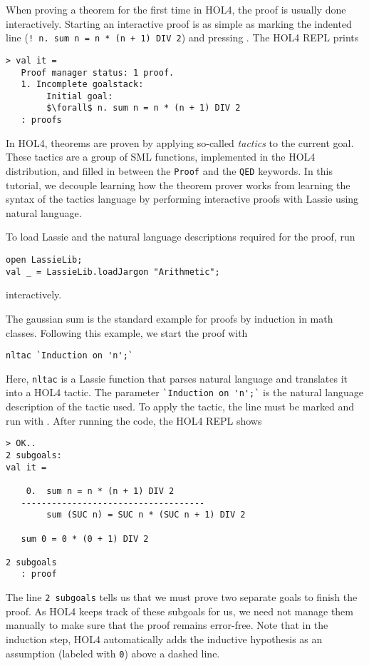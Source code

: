 When proving a theorem for the first time in HOL4, the proof is usually done
interactively.
Starting an interactive proof is as simple as marking the indented line
(\lstinline{! n. sum n = n * (n + 1) DIV 2}) and pressing .
The HOL4 REPL prints

\begin{lstlisting}[mathescape=true, frame=single]
> val it =
   Proof manager status: 1 proof.
   1. Incomplete goalstack:
        Initial goal:
        $\forall$ n. sum n = n * (n + 1) DIV 2
   : proofs
\end{lstlisting}

In HOL4, theorems are proven by applying so-called \emph{tactics} to the current
goal.
These tactics are a group of SML functions, implemented in the HOL4
distribution, and filled in between the \lstinline{Proof} and the \lstinline{QED}
keywords.
In this tutorial, we decouple learning how the theorem prover works from
learning the syntax of the tactics language by performing interactive proofs
with Lassie using natural language.

To load Lassie and the natural language descriptions required for the proof,
run
\begin{lstlisting}
open LassieLib;
val _ = LassieLib.loadJargon "Arithmetic";
\end{lstlisting}
interactively.

The gaussian sum is the standard example for proofs by induction in math classes.
Following this example, we start the proof with
\begin{lstlisting}
nltac `Induction on 'n';`
\end{lstlisting}

Here, \lstinline{nltac} is a Lassie function that parses natural language and
translates it into a HOL4 tactic.
The parameter \lstinline{`Induction on 'n';`} is the natural language
description of the tactic used.
To apply the tactic, the line must be marked and run with .
After running the code, the HOL4 REPL shows
\begin{lstlisting}
> OK..
2 subgoals:
val it =

    0.  sum n = n * (n + 1) DIV 2
   ------------------------------------
        sum (SUC n) = SUC n * (SUC n + 1) DIV 2

   sum 0 = 0 * (0 + 1) DIV 2

2 subgoals
   : proof
\end{lstlisting}

The line \lstinline{2 subgoals} tells us that we must prove two separate goals
to finish the proof.
As HOL4 keeps track of these subgoals for us, we need not manage them manually
to make sure that the proof remains error-free.
Note that in the induction step, HOL4 automatically adds the inductive
hypothesis as an assumption (labeled with \lstinline{0}) above a dashed line.

